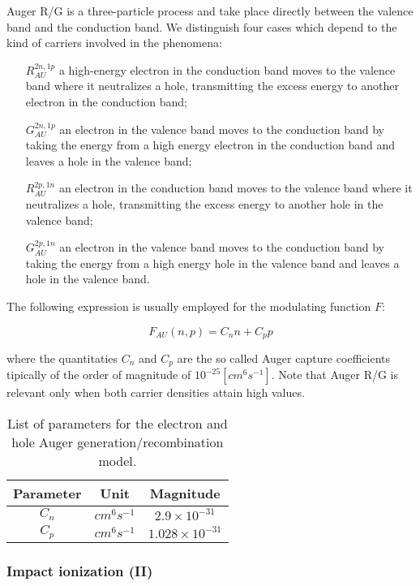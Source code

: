 Auger R/G is a three-particle process and take place directly between the valence band and the conduction band. We distinguish four cases which depend to the kind of carriers involved in the phenomena:
\begin{itemize}
\item[$R_{AU}^{2n,1p}$] a high-energy electron in the conduction band moves to the valence band where it neutralizes a hole, transmitting the excess energy to another electron in the conduction band;
\item[$G_{AU}^{2n,1p}$] an electron in the valence band moves to the conduction band by taking the energy from a high energy electron in the conduction band and leaves a hole in the valence band;
\item[$R_{AU}^{2p,1n}$] an electron in the conduction band moves to the valence band where it neutralizes a hole, transmitting the excess energy to another hole in the valence band;
\item[$G_{AU}^{2p,1n}$] an electron in the valence band moves to the conduction band by taking the energy from a high energy hole in the valence band and leaves a hole in the valence band.
\end{itemize}

The following expression is usually employed for the modulating function $F$:

\begin{equation}
F_{AU}(n,p) = C_nn+C_pp
\end{equation}

where the quantitaties $C_n$ and $C_p$ are the so called  Auger capture coefficients tipically of the order of magnitude of $10^{-25}[cm^6s^{-1}]$.
Note that Auger R/G is relevant only when both carrier densities attain high values.

\begin{table}[!h]
\centering
\begin{tabular}{ccc}
\toprule
Parameter & Unit & Magnitude \\
\midrule
$C_n$ & $cm^6s^{-1}$ & $2.9 \times 10^{-31}$ \\
$C_p$ & $cm^6s^{-1}$ & $1.028 \times 10^{-31}$ \\
\bottomrule
\end{tabular}
\caption{List of parameters for the electron and hole Auger generation/recombination model.}
\end{table}

\subsubsection{Impact ionization (II)}
\label{sec: ImpactIonization}

